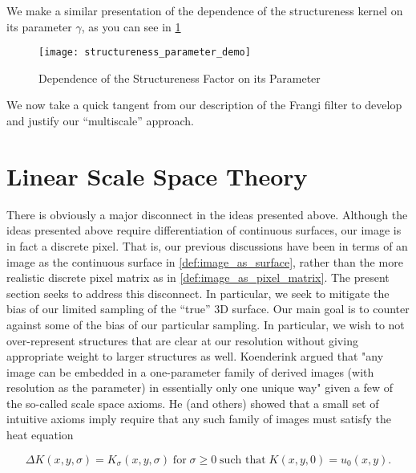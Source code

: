 We make a similar presentation of the dependence of the structureness kernel on its parameter $\gamma$, as you can see in
\cref{fig:structureness-parameter-demo}
    \begin{figure}
    \texttt{[image: structureness\_parameter\_demo]}
    \caption{Dependence of the Structureness Factor on its Parameter}
    \label{fig:structureness-parameter-demo}
  \end{figure}





	We now take a quick tangent from our description of the Frangi filter to develop and justify our ``multiscale'' approach.
	
        
    \section{Linear Scale Space Theory} \label{sec:scale-space-theory}
    
    
    There is obviously a major disconnect in the ideas presented above. 
    Although the ideas presented above require differentiation of continuous
    surfaces, our image is in fact a discrete pixel. That is, our previous discussions have been in terms of an image as the continuous surface in \cref{def:image_as_surface},
    rather than the more realistic discrete pixel matrix as in \cref{def:image_as_pixel_matrix}.
    The present section seeks to address this disconnect.
    In particular, we seek to mitigate the bias of our limited sampling
    of the ``true'' 3D surface. Our main goal is to counter against some of the bias of our particular sampling. In particular, we wish to not over-represent structures that
    are clear at our resolution without giving appropriate weight to larger structures as well.
    Koenderink \cite{Koenderink} argued that "any image can be embedded in a one-parameter family of derived images (with resolution as the parameter) in essentially only one unique way" given a few of the so-called scale space axioms. He (and others) showed that a small set of intuitive axioms imply require that any such family of images must satisfy the heat equation
    
    \begin{equation} \label{eq:heat-eq-for-family}
    \Delta K(x,y,\sigma) = K_\sigma (x,y,\sigma) 
    \;\text{for}\; \sigma \ge 0
    \;\text{such that}\; K(x,y, 0) = u_0(x,y).
    \end{equation}
    
